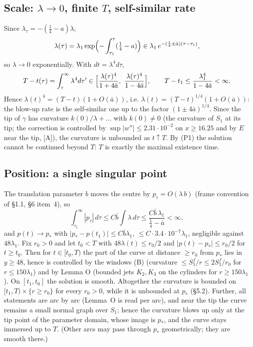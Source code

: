 \documentclass[11pt]{article}
\theoremstyle{definition}
\theoremstyle{remark}
\newcommand{\tA}{\textsc{[A]}}
\begin{document}
\subsection{Scale: $\lambda\to0$, finite $T$, self-similar rate}
Since $\lambda_\tau=-(\tfrac14-a)\lambda$,
\[
\lambda(\tau)=\lambda_1\exp\Bigl(-\int_{\tau_1}^{\tau}(\tfrac14-a)\Bigr)\in\lambda_1\,e^{-(\frac14\pm\bar a)(\tau-\tau_1)} ,
\]
so $\lambda\to0$ exponentially. With $dt=\lambda^4d\tau$,
\[
T-t(\tau)=\int_\tau^\infty\lambda^4d\tau'\in\Bigl[\frac{\lambda(\tau)^4}{1+4\bar a},\ \frac{\lambda(\tau)^4}{1-4\bar a}\Bigr],\qquad T-t_1\le\frac{\lambda_1^4}{1-4\bar a}<\infty .
\]
Hence $\lambda(t)^4=(T-t)(1+O(\bar a))$, i.e. $\lambda(t)=(T-t)^{1/4}(1+O(\bar a))$: the blow-up rate is the self-similar one up to the factor $(1\pm4\bar a)^{1/4}$. Since the tip of $\gamma$ has curvature $k(0)/\lambda+\ldots$ with $k(0)\neq0$ (the curvature of $S_1$ at its tip; the correction is controlled by $\sup|w''|\le2.31\cdot10^{-2}$ on $x\ge16.25$ and by $E$ near the tip, \tA), the curvature is unbounded as $t\uparrow T$. By (P1) the solution cannot be continued beyond $T$: $T$ is exactly the maximal existence time.

\subsection{Position: a single singular point}
The translation parameter $b$ moves the centre by $p_\tau=O(\lambda\,b)$ (frame convention of \S1.1, \S6 item~4), so
\[
\int_{\tau_1}^\infty|p_\tau|\,d\tau\le C\bar b\int\lambda\,d\tau\le\frac{C\bar b\,\lambda_1}{\tfrac14-\bar a}<\infty ,
\]
and $p(t)\to p_*$ with $|p_*-p(t_1)|\le C\bar b\lambda_1$, $\le C\cdot3.4\cdot10^{-7}\lambda_1$, negligible against $48\lambda_1$. Fix $r_0>0$ and let $t_0<T$ with $48\lambda(t)\le r_0/2$ and $|p(t)-p_*|\le r_0/2$ for $t\ge t_0$. Then for $t\in[t_0,T)$ the part of the curve at distance $\ge r_0$ from $p_*$ lies in $y\ge48$, hence is controlled by the windows (B) (curvature $\le S_1^f/r\le2S_1^f/r_0$ for $r\le150\lambda_1$) and by Lemma O (bounded jets $K_2,K_3$ on the cylinders for $r\ge150\lambda_1$). On $[t_1,t_0]$ the solution is smooth. Altogether the curvature is bounded on $[t_1,T)\times\{r\ge r_0\}$ for every $r_0>0$, while it is unbounded at $p_*$ (\S5.2). Further, all statements are arc by arc (Lemma~O is read per arc), and near the tip the curve remains a small normal graph over $S_1$; hence the curvature blows up only at the tip point of the parameter domain, whose image is $p_*$, and the curve stays immersed up to $T$. (Other arcs may pass through $p_*$ geometrically; they are smooth there.)
\end{document}
